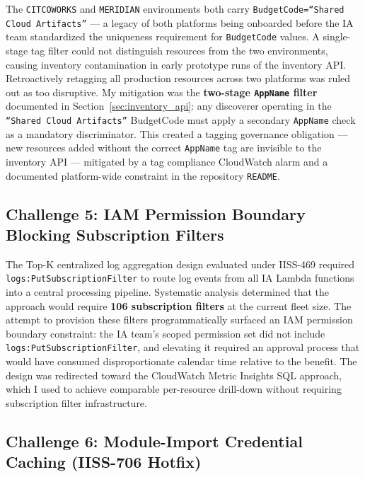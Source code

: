 The \texttt{CITCOWORKS} and \texttt{MERIDIAN} environments both carry
\texttt{BudgetCode=``Shared Cloud Artifacts''} --- a legacy of both platforms
being onboarded before the IA team standardized the uniqueness requirement for
\texttt{BudgetCode} values. A single-stage tag filter could not distinguish
resources from the two environments, causing inventory contamination in early
prototype runs of the inventory API. Retroactively retagging all production
resources across two platforms was ruled out as too disruptive. My mitigation
was the \textbf{two-stage \texttt{AppName} filter} documented in
Section~\ref{sec:inventory_api}: any discoverer operating in the
\texttt{``Shared Cloud Artifacts''} BudgetCode must apply a secondary
\texttt{AppName} check as a mandatory discriminator. This created a tagging
governance obligation --- new resources added without the correct
\texttt{AppName} tag are invisible to the inventory API --- mitigated by a tag
compliance CloudWatch alarm and a documented platform-wide constraint in the
repository \texttt{README}.

\subsection{Challenge 5: IAM Permission Boundary Blocking Subscription Filters}

The Top-K centralized log aggregation design evaluated under IISS-469 required
\texttt{logs:PutSubscriptionFilter} to route log events from all IA Lambda
functions into a central processing pipeline. Systematic analysis determined
that the approach would require \textbf{106 subscription filters} at the
current fleet size. The attempt to provision these filters programmatically
surfaced an IAM permission boundary constraint: the IA team's scoped permission
set did not include \texttt{logs:PutSubscriptionFilter}, and elevating it
required an approval process that would have consumed disproportionate
calendar time relative to the benefit. The design was redirected toward the
CloudWatch Metric Insights SQL approach, which I used to achieve comparable per-resource
drill-down without requiring subscription filter infrastructure.

\subsection{Challenge 6: Module-Import Credential Caching (IISS-706 Hotfix)}

